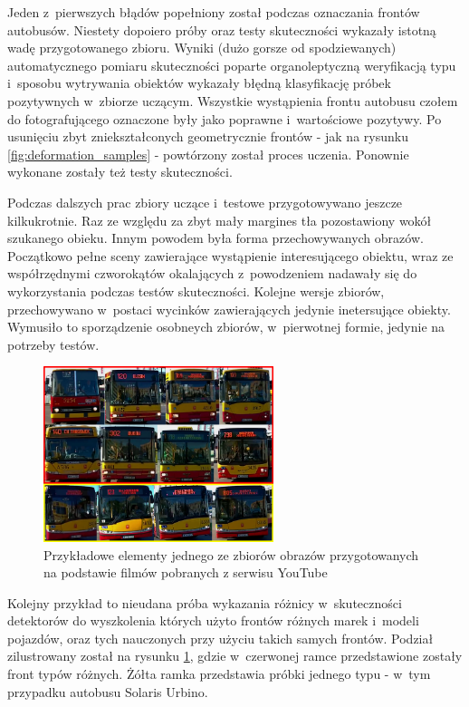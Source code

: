 Jeden z~pierwszych błądów popełniony został podczas oznaczania
frontów autobusów. Niestety dopoiero próby oraz testy skuteczności wykazały
istotną wadę przygotowanego zbioru. Wyniki (dużo gorsze od spodziewanych)
automatycznego pomiaru skuteczności poparte organoleptyczną weryfikacją 
typu i~sposobu wytrywania obiektów wykazały błędną klasyfikację próbek pozytywnych
w~zbiorze uczącym. Wszystkie wystąpienia frontu autobusu czołem do fotografującego
oznaczone były jako poprawne i~wartościowe pozytywy. Po usunięciu zbyt
zniekształconych geometrycznie frontów - jak na rysunku \ref{fig:deformation_samples} -
powtórzony został proces uczenia. Ponownie wykonane zostały też testy skuteczności.

Podczas dalszych prac zbiory uczące i~testowe przygotowywano jeszcze kilkukrotnie.
Raz ze względu
za zbyt mały margines tła pozostawiony wokół szukanego obieku. Innym powodem 
była forma przechowywanych obrazów. Początkowo pełne sceny zawierające wystąpienie
interesującego obiektu, wraz ze współrzędnymi czworokątów okalających z~powodzeniem
nadawały się do wykorzystania podczas testów skuteczności. Kolejne wersje
zbiorów, przechowywano w~postaci wycinków zawierających jedynie inetersujące obiekty.
Wymusiło to sporządzenie osobneych zbiorów, w~pierwotnej formie, jedynie na potrzeby testów.

\begin{figure}[!h]
	\centering
	\includegraphics[width=0.6\textwidth]{img/exp_trainig_data_jJ9}
	\caption{Przykładowe elementy jednego ze zbiorów obrazów
		przygotowanych na podstawie
		filmów pobranych z serwisu YouTube}
	\label{fig:jJ9ixBfVR5k_types}
\end{figure}

Kolejny przykład to nieudana próba wykazania różnicy w~skuteczności detektorów
do wyszkolenia których użyto frontów różnych marek i~modeli pojazdów, oraz tych
nauczonych przy użyciu takich samych frontów. Podział zilustrowany został na 
rysunku \ref{fig:jJ9ixBfVR5k_types}, gdzie w~czerwonej ramce przedstawione
zostały front typów różnych. Żółta ramka przedstawia próbki jednego typu - 
w~tym przypadku autobusu Solaris Urbino.

